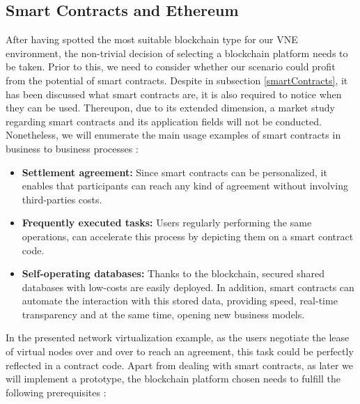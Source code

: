 \subsection{Smart Contracts and Ethereum}

After having spotted the most suitable blockchain type for our VNE environment, the non-trivial decision of selecting a blockchain platform needs to be taken. Prior to this, we need to consider whether our scenario could profit from the potential of smart contracts. Despite in subsection \ref{smartContracts}, it has been discussed what smart contracts are, it is also required to notice when they can be used. Thereupon, due to its extended dimension, a market study regarding smart contracts and its application fields will not be conducted. Nonetheless, we will enumerate the main usage examples of smart contracts in business to business processes \citep{blockchainBerkeley}:

\begin{itemize}
	\item \textbf{Settlement agreement:} Since smart contracts can be personalized, it enables that participants can reach any kind of agreement without involving third-parties costs.
	\item \textbf{Frequently executed tasks:} Users regularly performing the same operations, can accelerate this process by depicting them on a smart contract code.
	\item \textbf{Self-operating databases:} Thanks to the blockchain, secured shared databases with low-costs are easily deployed. In addition, smart contracts can automate the interaction with this stored data, providing speed, real-time transparency and at the same time, opening new business models. 
\end{itemize}

In the presented network virtualization example, as the users negotiate the lease of virtual nodes over and over to reach an agreement, this task could be perfectly reflected in a contract code. Apart from dealing with smart contracts, as later we will implement a prototype, the blockchain platform chosen needs to fulfill the following prerequisites \citep{macdonald2017}: 

